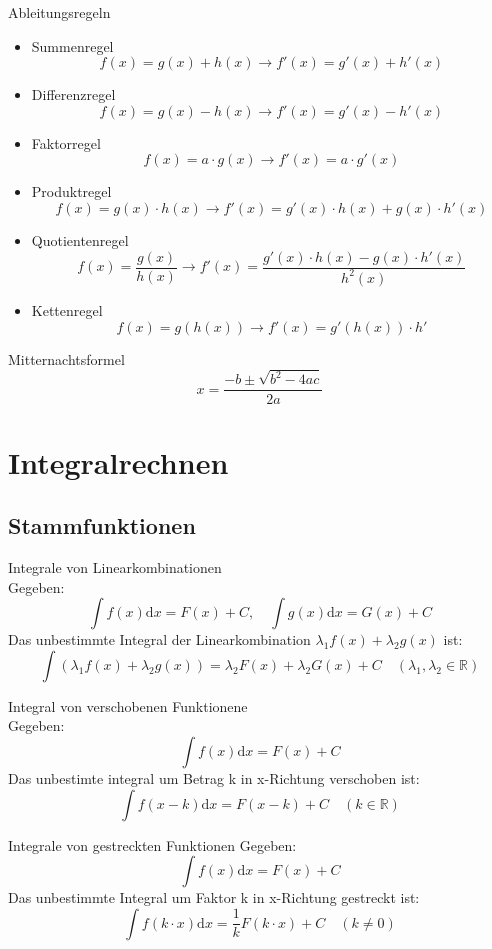 \columnbreak
\begin{lemma}{Ableitungsregeln}\\
    \begin{itemize}
	\item Summenregel
	    \[f(x)=g(x)+h(x) \rightarrow f'(x)=g'(x)+h'(x) \]
	\item Differenzregel
	    \[f(x)= g(x) - h(x) \rightarrow f'(x) = g'(x) - h'(x) \]
	\item Faktorregel 
	    \[f(x)=a\cdot g(x) \rightarrow f'(x)=a \cdot g'(x) \]
	\item Produktregel
	    \[f(x)=g(x)\cdot h(x) \rightarrow f'(x)=g'(x)\cdot h(x) + g(x) \cdot h'(x) \]
	\item Quotientenregel 
	    \[f(x)=\frac{g(x)}{h(x)} \rightarrow f'(x)=\frac{g'(x)\cdot h(x)-g(x)\cdot
	    h'(x)}{h^2(x)}\]
	\item Kettenregel
	    \[f(x)=g(h(x)) \rightarrow f'(x)=g'(h(x))\cdot h'\]
    \end{itemize}
\end{lemma}
\begin{lemma}{Mitternachtsformel}\\
    \[x=\frac{-b\pm\sqrt{b^2-4ac}}{2a}\]
\end{lemma}
\section{Integralrechnen}
\subsection{Stammfunktionen}
\begin{lemma}{Integrale von Linearkombinationen}\\
	Gegeben:
	\[\int{f(x)\mathrm{d}x} = F(x)+C, \quad  \int{g(x)\mathrm{d}x} = G(x)+C\]
	Das unbestimmte Integral der Linearkombination \(\lambda_1f(x) + \lambda_2g(x)\) ist:
	\[\int{(\lambda_1f(x)+\lambda_2g(x))} = \lambda_2F(x)+\lambda_2G(x)+C \quad (\lambda_1,\lambda_2 \in \mathbb{R} )\]
\end{lemma}
\begin{lemma}{Integral von verschobenen Funktionene}\\
	Gegeben:
	\[\int{f(x)\mathrm{d}x} = F(x) + C \]
	Das unbestimte integral um Betrag k in x-Richtung verschoben ist:
	\[\int{f(x-k)\mathrm{d}x}= F(x-k)+C \quad (k \in \mathbb{R}) \]
\end{lemma}
\begin{lemma}{Integrale von gestreckten Funktionen}
	Gegeben:
	\[\int{f(x)\mathrm{d}x} = F(x)+C \]
	Das unbestimmte Integral um Faktor k in x-Richtung gestreckt ist:
	\[\int{f(k\cdot x)\mathrm{d}x}= \frac{1}{k}F(k\cdot x)+C \quad (k\neq0 )\]
\end{lemma}
